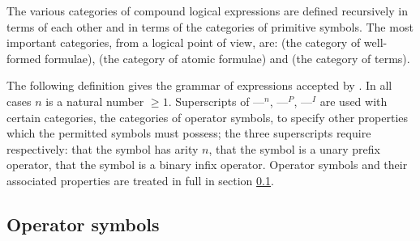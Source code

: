 The various categories of compound logical expressions are defined
recursively in terms of each other and in terms of the categories of
primitive symbols. The most important categories, from a logical point of
view, are: {\wff} (the category of well-formed formulae), {\awff} (the
category of atomic formulae) and {\term} (the category of terms).

The following definition gives the 
grammar of expressions accepted by {\GF}. In all cases $n$
is a natural number $\geq 1$.
Superscripts of
---$^n$, ---$^P$, ---$^I$ are used with certain categories,
the categories of operator symbols, to specify other properties which the
permitted symbols must possess; the three superscripts require
respectively: that the
symbol has arity $n$, that the symbol is a unary prefix operator, that the
symbol is a binary infix operator. Operator symbols and their associated
properties are treated in full in section \ref{opsym}.

\gap
\begin{center}
\end{center}

\subsection{Operator symbols}
\label{opsym}

